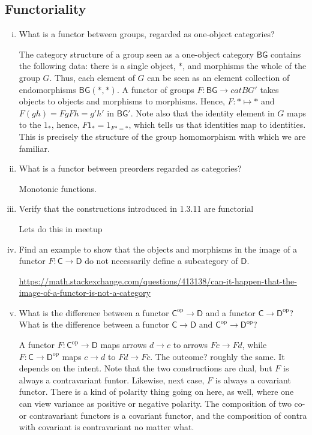 \documentclass[10pt, oneside]{article}   	%
\newcommand{\cat}[1]{\bm{ \mathsf{#1} }}
\newcommand{\cc}{\cat{C}}
\newcommand{\dd}{\cat{D}}
\newcommand{\op}[1]{#1^{\text{op}}}
\newcommand{\opc}{\op{\cc}}
\newcommand{\opd}{\op{\dd}}
\begin{document}
\subsection{Functoriality}


\begin{enumerate}[(i)]

\item What is a functor between groups, regarded as one-object categories?

The category structure of a group seen as a one-object category $\cat{BG}$ contains the following data: there is a single object, $*$, and morphisms the whole of the group $G$. Thus, each element of $G$ can be seen as an element collection of endomorphisms $\cat{BG}(*,*)$. A functor of groups $F: \cat{BG} \to cat{BG'}$ takes objects to objects and morphisms to morphisms. Hence, $F : * \mapsto *$ and $F(gh) = FgFh = g'h'$ in $\cat{BG'}$. Note also that the identity element in $G$ maps to the $1_*$, hence, $F1_* = 1_{F* = *}$, which tells us that identities map to identities. This is precisely the structure of the group homomorphism with which we are familiar.

\item What is a functor between preorders regarded as categories? 

Monotonic functions. 

\item Verify that the constructions introduced in 1.3.11 are functorial 

Lets do this in meetup

\item Find an example to show that the objects and morphisms in the image of a functor $F : \cc \to \dd$ do not necessarily define a subcategory of $\dd$. 

\href{This MO question}{https://math.stackexchange.com/questions/413138/can-it-happen-that-the-image-of-a-functor-is-not-a-category}


\item What is the difference between a functor $\opc \to \dd$ and a functor $\cc \to \opd$? What is the difference between a functor $\cc \to \dd$ and $\opc \to \opd$?

A functor $F : \opc \to \dd$ maps arrows $d \to c$ to arrows $Fc \to Fd$, while $F : \cc \to \opd$ maps $c \to d$ to $Fd \to Fc$. The outcome? roughly the same. It depends on the intent. Note that the two constructions are dual, but $F$ is always a contravariant funtor. Likewise, next case, $F$ is always a covariant functor. There is a kind of polarity thing going on here, as well, where one can view variance as positive or negative polarity. The composition of two co- or contravariant functors is a covariant functor, and the composition of contra with covariant is contravariant no matter what. 


\end{enumerate}
\end{document}
